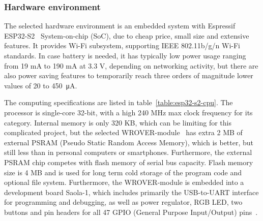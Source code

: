 


\subsubsection*{Hardware environment}
The selected hardware environment is an embedded system with Espressif ESP32-S2~\cite{esp32-s2-datasheet} System-on-chip (SoC), due to cheap price, small size and extensive features. It provides Wi-Fi subsystem, supporting IEEE 802.11b/g/n Wi-Fi standards. In case battery is needed, it has typically low power usage ranging from 19 mA to 190 mA at 3.3 V, depending on networking activity, but there are also power saving features to temporarily reach three orders of magnitude lower values of 20 to \SI{450}{\uA}.

The computing specifications are listed in table~\ref{table:esp32-s2-cpu}. The processor is single-core 32-bit, with a high 240 MHz max clock frequency for its category. Internal memory is only 320 KB, which can be limiting for this complicated project, but the selected WROVER-module~\cite{esp32-s2-wrover} has extra 2 MB of external PSRAM (Pseudo Static Random Access Memory), which is better, but still less than in personal computers or smartphones. Furthermore, the external PSRAM chip competes with flash memory of serial bus capacity. Flash memory size is 4 MB and is used for long term cold storage of the program code and optional file system. Furthermore, the WROVER-module is embedded into a development board Saola-1, which includes primarily the USB-to-UART interface for programming and debugging, as well as power regulator, RGB LED, two buttons and pin headers for all 47 GPIO (General Purpose Input/Output) pins~\cite{esp32-s2-saola1-schematics}. 

